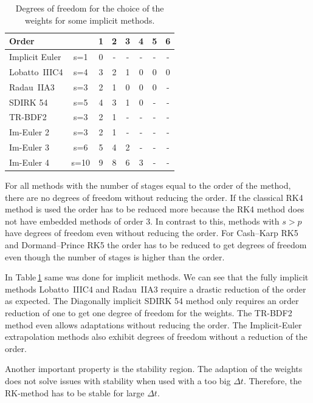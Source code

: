 \documentclass[a4paper]{article}
\numberwithin{equation}{section}
\theoremstyle{plain}
\theoremstyle{definition}
\numberwithin{theorem}{section}
\newcommand{\dt}{{\Delta t}}
\newcommand{\1}{\mathbbm{1}}
\begin{document}
 \begin{table}[h!]
\centering   %
\begin{tabular}{|l c|c c c c c c |} 
 \hline 
Order & &1&2&3&4&5&6 \\ 
 \hline Implicit Euler& s=1&0& - & - & - & - & -  \\ 
 Lobatto~IIIC4& s=4&3&2&1&0&0&0 \\
 Radau~IIA3& s=3&2&1&0&0&0& -  \\
 SDIRK 54& s=5&4&3&1&0& - & -  \\ 
 TR-BDF2& s=3&2&1& - & - & - & -  \\ 
 Im-Euler 2& s=3&2&1& - & - & - & -  \\ 
 Im-Euler 3& s=6&5&4&2& - & - & -  \\ 
 Im-Euler 4& s=10&9&8&6&3& - & -  \\ 
 \hline 
 \end{tabular}
 \caption{Degrees of freedom for the choice of the weights for some implicit methods.} %
 \label{table:DOF_imp}
 \end{table}


For all methods with the number of stages equal to the order of the method, there are no degrees of freedom without reducing the order.  
If the classical RK4 method is used the order has to be reduced more because the RK4 method does not have embedded methods of order 3.
In contrast to this, methods with $s > p$ have degrees of freedom even without reducing the order.
For Cash--Karp RK5 and Dormand--Prince RK5 the order has to be reduced to get degrees of freedom even though the number of stages is higher than the order.

 
In Table\,\ref{table:DOF_imp} same was done for implicit methods. 
We can see that the fully implicit methods Lobatto~IIIC4 and Radau~IIA3 require a drastic reduction of the order as expected.
The Diagonally implicit SDIRK 54 method only requires an order reduction of one to get one degree of freedom for the weights.  
The TR-BDF2 method even allows adaptations without reducing the order.  
The Implicit-Euler extrapolation methods also exhibit degrees of freedom without a reduction of the order. 

Another important property is the stability region. 
The adaption of the weights does not solve issues with stability when used with a too big $\dt$. Therefore, the RK-method has to be stable for large $\dt$. 

\end{document}
